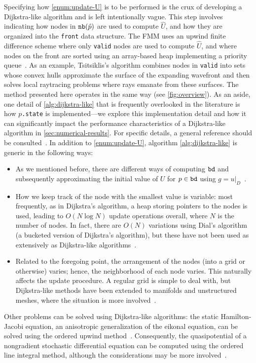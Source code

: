 \documentclass[eikonal.tex]{subfiles}
\begin{document}
Specifying how \cref{enum:update-U} is to be performed is the crux of
developing a Dijkstra-like algorithm and is left intentionally
vague. This step involves indicating how nodes in $\texttt{nb}(\hat{p})$ are
used to compute $\hat{U}$, and how they are organized into the
\texttt{front} data structure. The FMM uses an upwind finite
difference scheme where only \texttt{valid} nodes are used to compute
$\hat{U}$, and where nodes on the front are sorted using an
array-based heap implementing a priority
queue~\cite{sethian1996fast}. As an example, Tsitsiklis's algorithm
combines nodes in \texttt{valid} into sets whose convex hulls
approximate the surface of the expanding wavefront and then solves
local raytracing problems where rays emanate from these surfaces. The
method presented here operates in the same way (see
\cref{fig:overview}). As an aside, one detail of
\cref{alg:dijkstra-like} that is frequently overlooked in the
literature is how $p$\texttt{.state} is implemented---we explore this
implementation detail and how it can significantly impact the
performance characteristics of a Dijkstra-like algorithm in
\cref{sec:numerical-results}. For specific details, a general
reference should be consulted~\cite{sethian1999level}. In addition to
\cref{enum:update-U}, algorithm \cref{alg:dijkstra-like} is generic in
the following ways:
\begin{itemize}
\item As we mentioned before, there are different ways of computing
  $\texttt{bd}$ and subsequently approximating the initial value of $U$
  for $p \in \texttt{bd}$ using
  $g = \left. u \right|_D$~\cite{chopp2001some}.
\item How we keep track of the node with the smallest value is
  variable: most frequently, as in Dijkstra's algorithm, a heap
  storing pointers to the nodes is used, leading to $O(N \log N)$
  update operations overall, where $N$ is the number of nodes. In
  fact, there are $O(N)$ variations using Dial's algorithm (a bucketed
  version of Dijkstra's algorithm), but these have not been used as
  extensively as Dijkstra-like
  algorithms~\cite{tsitsiklis1995efficient,kim2001calo}.
\item Related to the foregoing point, the arrangement of the nodes
  (into a grid or otherwise) varies; hence, the neighborhood of each
  node varies. This naturally affects the update procedure. A regular
  grid is simple to deal with, but Dijkstra-like methods have been
  extended to manifolds and unstructured meshes, where the situation
  is more
  involved~\cite{kimmel1998computing,sethian2000fast,bronstein2008numerical}.
\end{itemize}
Other problems can be solved using Dijkstra-like algorithms: the
static Hamilton-Jacobi equation, an anisotropic generalization of the
eikonal equation, can be solved using the ordered upwind
method~\cite{sethian2003ordered}. Consequently, the quasipotential of
a nongradient stochastic differential equation can be computed using
the ordered line integral method, although the considerations may be
more
involved~\cite{dahiya2017ordered,dahiya2018ordered,yang2018computing}.
\end{document}
